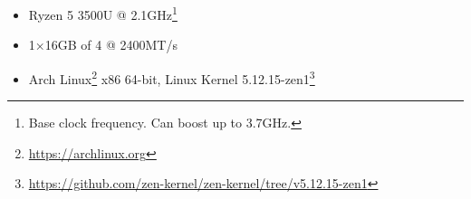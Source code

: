 \begin{itemize}
  \item {}\label{acro:AMD} Ryzen\textsuperscript{\texttrademark} 5 3500U
  \label{acro:CPU} @ 2.1GHz\footnote{Base clock frequency.  Can boost
  up to 3.7GHz.}
  \item 1×16GB \label{acro:SO-DIMM} of \label{acro:DDR}4
  \label{acro:RAM} @ 2400MT/s
  \item Arch
  Linux\textsuperscript{\texttrademark}\footnote{\url{https://archlinux.org}}
  x86 64-bit, Linux{\textregistered} Kernel
  5.12.15-zen1\footnote{\url{https://github.com/zen-kernel/zen-kernel/tree/v5.12.15-zen1}}
\end{itemize}
\clearpage







